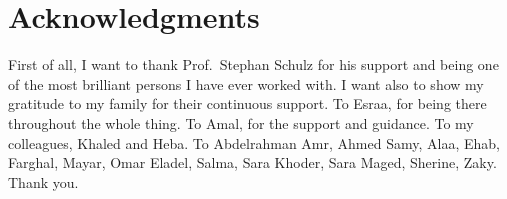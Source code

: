 \chapter*{Acknowledgments}
\label{chap:ack}

First of all, I want to thank Prof.\ Stephan Schulz for his support and being one of the most brilliant persons I have ever worked with. I want also to show my gratitude to my family for their continuous support. To Esraa, for being there throughout the whole thing. To Amal, for the support and guidance. To my colleagues, Khaled and Heba. To Abdelrahman Amr, Ahmed Samy, Alaa, Ehab, Farghal, Mayar, Omar Eladel, Salma, Sara Khoder, Sara Maged, Sherine, Zaky. Thank you.
